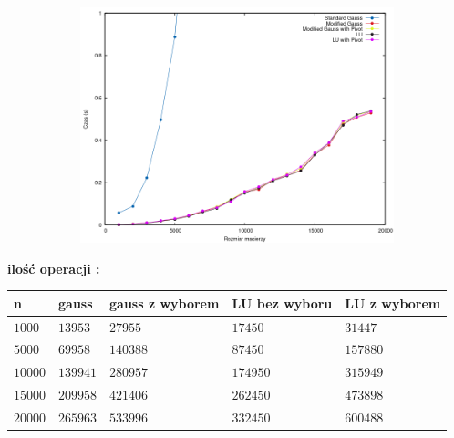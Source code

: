 \documentclass{article}
\begin{document}
\begin{figure}[ht]
	\centering
	\begin{subfigure}{0.80\textwidth}
		\centering
		\includegraphics[width=1.0\linewidth]{../plots/plot_time.png}  
	\end{subfigure}
\end{figure}
\newpage
\noindent \textbf{ilość operacji :}
\begin{center}
	\begin{tabular}{|p{1cm}|p{3cm}|p{3cm}|p{3cm}|p{3cm}|}
		\hline
		\textbf{n}  & \textbf{gauss} & \textbf{gauss z wyborem} & \textbf{LU bez wyboru} & \textbf{LU z wyborem}  \\
		\hline
		$1000$ & $13953$ & $27955$ & $17450$ & $31447$ \\
		\hline
		$5000$ & $69958$ & $140388$ & $87450$ & $157880$ \\
		\hline
		$10000$ & $139941$ & $280957$ & $174950$ & $315949$  \\
		\hline
		$15000$ & $209958$ & $421406$ & $262450$ & $473898$  \\
		\hline
		$20000$ & $265963$ & $533996$ & $332450$ & $600488$ \\
		\hline
	\end{tabular}
\end{center}
\end{document}
